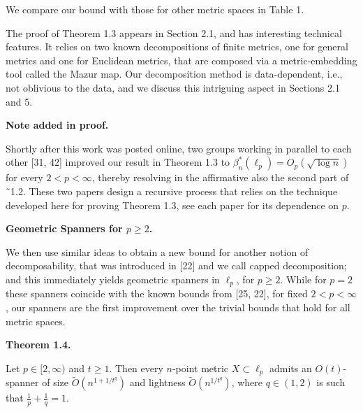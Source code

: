 \documentclass[10pt,a4paper]{amsart}
\begin{document}
\par
\par
We compare our bound with those for other metric spaces in Table 1.
\par
\par
The proof of Theorem 1.3 appears in Section 2.1, and has interesting technical features. It relies on two known decompositions of finite metrics, one for general metrics and one for Euclidean metrics, that are composed via a metric-embedding tool called the Mazur map. Our decomposition method is data-dependent, i.e., not oblivious to the data, and we discuss this intriguing aspect in Sections 2.1 and 5.
\par
\par
\par\medskip\noindent\textbf{Note added in proof.}\par
Shortly after this work was posted online, two groups working in parallel to each other [31, 42] improved our result in Theorem 1.3 to $\beta^{*}_{n}(\ell_{p})=O_{p}(\sqrt{\log{n}})$ for every $2<p<\infty$, thereby resolving in the affirmative also the second part of ˜1.2. These two papers design a recursive process that relies on the technique developed here for proving Theorem 1.3, see each paper for its dependence on $p$.
\par
\par
\par
\par\medskip\noindent\textbf{Geometric Spanners for $p\geq 2$.}\par
We then use similar ideas to obtain a new bound for another notion of decomposability, that was introduced in [22] and we call capped decomposition; and this immediately yields geometric spanners in $\ell_{p}$, for $p\geq 2$. While for $p=2$ these spanners coincide with the known bounds from [25, 22], for fixed $2<p<\infty$, our spanners are the first improvement over the trivial bounds that hold for all metric spaces.
\par
\par
\par\medskip\noindent\textbf{Theorem 1.4.}\par
Let $p\in[2,\infty)$ and $t\geq 1$. Then every $n$-point metric $X\subset\ell_{p}$ admits an $O(t)$-spanner of size $\tilde{O}\left(n^{1+1/t^{q}}\right)$ and lightness $\tilde{O}\left(n^{1/t^{q}}\right)$, where $q\in(1,2)$ is such that $\frac{1}{p}+\frac{1}{q}=1$.
\par
\par
\par
\end{document}
